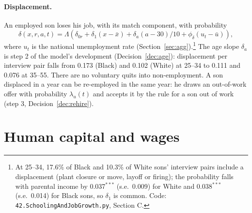 \documentclass[11pt]{article}
\newcommand{\code}[1]{\texttt{#1}}
\newcommand{\1}{\mathbf{1}}
\begin{document}
\paragraph{Displacement.} An employed son loses his job, with its match component, with probability
\begin{equation}\label{eq:delta}
\delta(x, r, a, t) = \Lambda\left(\delta_{0r} + \delta_1 (x - \bar x) + \delta_a (a - 30)/10 + \phi_\delta (u_t -
\bar u)\right),
\end{equation}
where $u_t$ is the national unemployment rate (Section~\ref{sec:agg}).\footnote{At 25--34, 17.6\% of Black and 10.3\% of
White sons' interview pairs include a displacement (plant closure or move, layoff or firing); the probability falls with
parental income by 0.037$^{***}$ (s.e.\ 0.009) for White and 0.038$^{***}$ (s.e.\ 0.014) for Black sons, so $\delta_1$ is
common. Code: \code{42.SchoolingAndJobGrowth.py}, Section C.} The age slope $\delta_a$ is step 2 of the model's development (Decision~\ref{dec:age}): displacement per interview
pair falls from 0.173 (Black) and 0.102 (White) at 25--34 to 0.111 and 0.076 at 35--55. There are no voluntary quits
into non-employment. A son displaced in a year can be re-employed in the same year: he draws an out-of-work offer with
probability $\lambda_u(t)$ and accepts it by the rule for a son out of work (step 3, Decision~\ref{dec:rehire}).

\section{Human capital and wages}\label{sec:wages}
\end{document}
